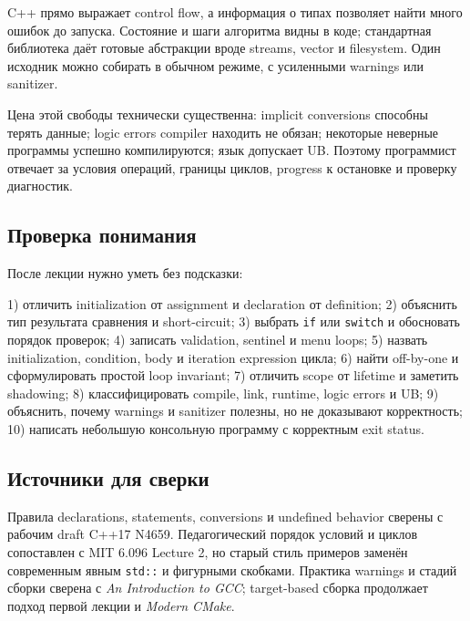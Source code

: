 C++ прямо выражает control flow, а информация о типах позволяет найти много
ошибок до запуска. Состояние и шаги алгоритма видны в коде; стандартная
библиотека даёт готовые абстракции вроде streams, vector и filesystem. Один
исходник можно собирать в обычном режиме, с усиленными warnings или sanitizer.

Цена этой свободы технически существенна: implicit conversions способны
терять данные; logic errors compiler находить не обязан; некоторые неверные
программы успешно компилируются; язык допускает UB. Поэтому программист
отвечает за условия операций, границы циклов, progress к остановке и проверку
диагностик.

\subsection{Проверка понимания}

После лекции нужно уметь без подсказки:

1) отличить initialization от assignment и declaration от definition; 2) объяснить тип результата сравнения и short-circuit; 3) выбрать \texttt{if} или \texttt{switch} и обосновать порядок проверок; 4) записать validation, sentinel и menu loops; 5) назвать initialization, condition, body и iteration expression цикла; 6) найти off-by-one и сформулировать простой loop invariant; 7) отличить scope от lifetime и заметить shadowing; 8) классифицировать compile, link, runtime, logic errors и UB; 9) объяснить, почему warnings и sanitizer полезны, но не доказывают корректность; 10) написать небольшую консольную программу с корректным exit status.

\subsection{Источники для сверки}

Правила declarations, statements, conversions и undefined behavior сверены с
рабочим draft C++17 N4659. Педагогический порядок условий и циклов сопоставлен
с MIT 6.096 Lecture 2, но старый стиль примеров заменён современным явным
\texttt{std::} и фигурными скобками. Практика warnings и стадий сборки сверена
с \textit{An Introduction to GCC}; target-based сборка продолжает подход
первой лекции и \textit{Modern CMake}.
